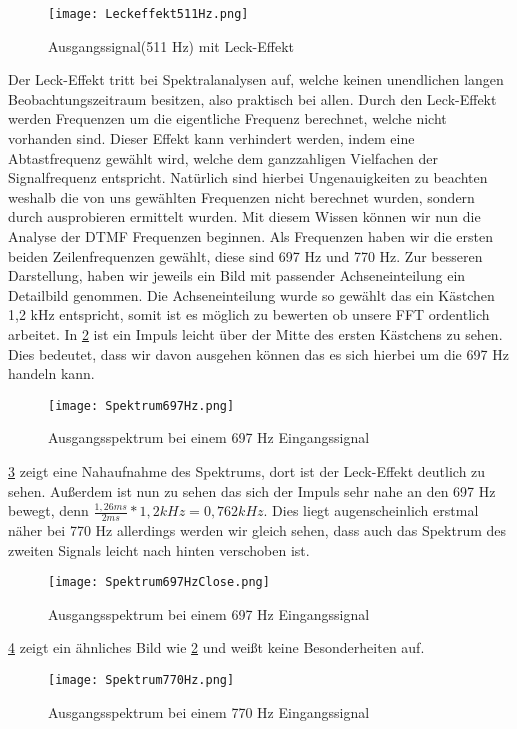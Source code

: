 \begin{figure}[H]
	\texttt{[image: Leckeffekt511Hz.png]}
  \caption{Ausgangssignal(511 Hz) mit Leck-Effekt}
  \label{fig:mLeckEffekt}
\end{figure}
Der Leck-Effekt tritt bei Spektralanalysen auf, welche keinen unendlichen langen Beobachtungszeitraum besitzen, also praktisch bei allen. Durch den Leck-Effekt werden Frequenzen um die eigentliche Frequenz berechnet, welche nicht vorhanden sind. Dieser Effekt kann verhindert werden, indem eine Abtastfrequenz gewählt wird, welche dem ganzzahligen Vielfachen der Signalfrequenz entspricht. Natürlich sind hierbei Ungenauigkeiten zu beachten weshalb die von uns gewählten Frequenzen nicht berechnet wurden, sondern durch ausprobieren ermittelt wurden. 
\newpage
Mit diesem Wissen können wir nun die Analyse der DTMF Frequenzen beginnen. Als Frequenzen haben wir die ersten beiden Zeilenfrequenzen gewählt, diese sind 697 Hz und 770 Hz.
Zur besseren Darstellung, haben wir jeweils ein Bild mit passender Achseneinteilung ein Detailbild genommen. Die Achseneinteilung wurde so gewählt das ein Kästchen 1,2 kHz entspricht, somit ist es möglich zu bewerten ob unsere FFT ordentlich arbeitet. In \cref{fig:Spekt697} ist ein Impuls leicht über der Mitte des ersten Kästchens zu sehen. Dies bedeutet, dass wir davon ausgehen können das es sich hierbei um die 697 Hz handeln kann.
\begin{figure}[H]
	\texttt{[image: Spektrum697Hz.png]}
  \caption{Ausgangsspektrum bei einem 697 Hz Eingangssignal}
  \label{fig:Spekt697}
\end{figure}

\cref{fig:Spekt697Close} zeigt eine Nahaufnahme des Spektrums, dort ist der Leck-Effekt deutlich zu sehen. Außerdem ist nun zu sehen das sich der Impuls sehr nahe an den 697 Hz bewegt, denn 
 \begin{math} \frac{1,26ms}{2ms} * 1,2 kHz = 0,762 kHz \end{math}. Dies liegt augenscheinlich erstmal näher bei 770 Hz allerdings werden wir gleich sehen, dass auch das Spektrum des zweiten Signals leicht nach hinten verschoben ist. 
\begin{figure}[H]
	\texttt{[image: Spektrum697HzClose.png]}
  \caption{Ausgangsspektrum bei einem 697 Hz Eingangssignal}
  \label{fig:Spekt697Close}
\end{figure}

\cref{fig:Spekt770} zeigt ein ähnliches Bild wie \cref{fig:Spekt697} und weißt keine Besonderheiten auf.
\begin{figure}[H]
	\texttt{[image: Spektrum770Hz.png]}
  \caption{Ausgangsspektrum bei einem 770 Hz Eingangssignal}
  \label{fig:Spekt770}
\end{figure}


